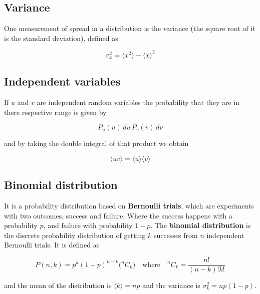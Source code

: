 \documentclass[a4paper]{article}
\begin{document}
\subsection{Variance}

One measurement of spread in a distribution is the variance (the square root of it is the standard deviation), defined as

\begin{equation}
	\sigma_x^2=\langle x^2 \rangle - \langle x \rangle^2
\end{equation}

\subsection{Independent variables}

If $u$ and $v$ are independent random variables the probability that they are in there respective range is given by

\begin{equation}
	P_u(u)\,du\,P_v(v)\,dv
\end{equation}

and by taking the double integral of that product we obtain

\begin{equation}
	\langle uv \rangle = \langle u \rangle \langle v \rangle
\end{equation}


\subsection{Binomial distribution}

It is a probability distribution based on \textbf{Bernoulli trials}, which are experiments with two outcomes, success and failure. Where the success happens with a probability $p$, and failure with probability $1-p$. The \textbf{binomial distribution} is the discrete probability distribution of getting $k$ successes from $n$ independent Bernoulli trials. It is defined as

\begin{equation}
	P(n, k) = p^k(1-p)^{n-k}\big({}^nC_k\big)\quad\text{where}\quad {}^nC_k=\frac{n!}{(n-k)!k!}
\end{equation}

and the mean of the distribution is $\langle k \rangle=np$ and the variance is $\sigma_k^2=np(1-p)$.
\end{document}
